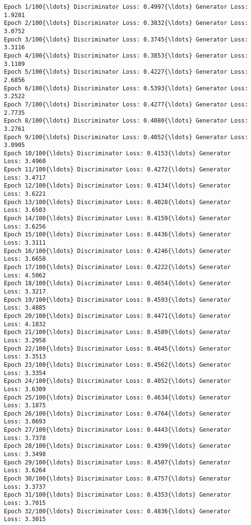 \documentclass[11pt]{article}
\begin{document}
    \begin{Verbatim}[commandchars=\\\{\}]
Epoch 1/100{\ldots} Discriminator Loss: 0.4997{\ldots} Generator Loss: 1.9281
Epoch 2/100{\ldots} Discriminator Loss: 0.3832{\ldots} Generator Loss: 3.0752
Epoch 3/100{\ldots} Discriminator Loss: 0.3745{\ldots} Generator Loss: 3.3116
Epoch 4/100{\ldots} Discriminator Loss: 0.3853{\ldots} Generator Loss: 3.1189
Epoch 5/100{\ldots} Discriminator Loss: 0.4227{\ldots} Generator Loss: 2.6856
Epoch 6/100{\ldots} Discriminator Loss: 0.5393{\ldots} Generator Loss: 3.2522
Epoch 7/100{\ldots} Discriminator Loss: 0.4277{\ldots} Generator Loss: 2.7735
Epoch 8/100{\ldots} Discriminator Loss: 0.4080{\ldots} Generator Loss: 3.2761
Epoch 9/100{\ldots} Discriminator Loss: 0.4052{\ldots} Generator Loss: 3.0905
Epoch 10/100{\ldots} Discriminator Loss: 0.4153{\ldots} Generator Loss: 3.4960
Epoch 11/100{\ldots} Discriminator Loss: 0.4272{\ldots} Generator Loss: 3.4717
Epoch 12/100{\ldots} Discriminator Loss: 0.4134{\ldots} Generator Loss: 3.6221
Epoch 13/100{\ldots} Discriminator Loss: 0.4028{\ldots} Generator Loss: 3.6503
Epoch 14/100{\ldots} Discriminator Loss: 0.4159{\ldots} Generator Loss: 3.6256
Epoch 15/100{\ldots} Discriminator Loss: 0.4436{\ldots} Generator Loss: 3.3111
Epoch 16/100{\ldots} Discriminator Loss: 0.4246{\ldots} Generator Loss: 3.6650
Epoch 17/100{\ldots} Discriminator Loss: 0.4222{\ldots} Generator Loss: 4.5062
Epoch 18/100{\ldots} Discriminator Loss: 0.4654{\ldots} Generator Loss: 3.3217
Epoch 19/100{\ldots} Discriminator Loss: 0.4593{\ldots} Generator Loss: 3.4885
Epoch 20/100{\ldots} Discriminator Loss: 0.4471{\ldots} Generator Loss: 4.1832
Epoch 21/100{\ldots} Discriminator Loss: 0.4589{\ldots} Generator Loss: 3.2958
Epoch 22/100{\ldots} Discriminator Loss: 0.4645{\ldots} Generator Loss: 3.3513
Epoch 23/100{\ldots} Discriminator Loss: 0.4562{\ldots} Generator Loss: 3.3354
Epoch 24/100{\ldots} Discriminator Loss: 0.4052{\ldots} Generator Loss: 3.6309
Epoch 25/100{\ldots} Discriminator Loss: 0.4634{\ldots} Generator Loss: 3.1875
Epoch 26/100{\ldots} Discriminator Loss: 0.4764{\ldots} Generator Loss: 3.0693
Epoch 27/100{\ldots} Discriminator Loss: 0.4443{\ldots} Generator Loss: 3.7378
Epoch 28/100{\ldots} Discriminator Loss: 0.4399{\ldots} Generator Loss: 3.3498
Epoch 29/100{\ldots} Discriminator Loss: 0.4507{\ldots} Generator Loss: 3.6264
Epoch 30/100{\ldots} Discriminator Loss: 0.4757{\ldots} Generator Loss: 3.3737
Epoch 31/100{\ldots} Discriminator Loss: 0.4353{\ldots} Generator Loss: 3.7015
Epoch 32/100{\ldots} Discriminator Loss: 0.4836{\ldots} Generator Loss: 3.3015

\end{Verbatim}
\end{document}
